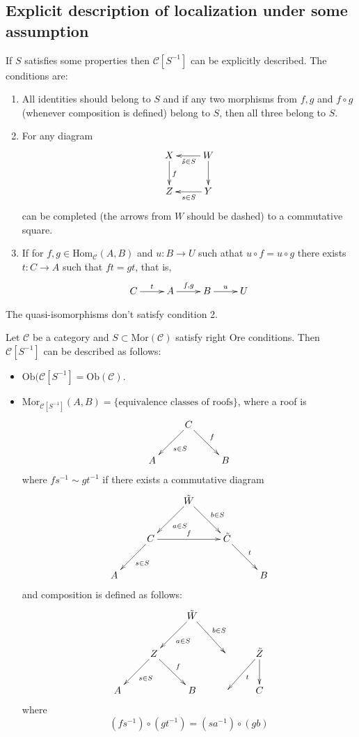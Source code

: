\subsection*{Explicit description of localization under some assumption}
\label{subsection-explicit-description-of-localization}

If $S$ satisfies some properties then $\mathcal{C}[S^{-1}]$ can be explicitly
described. The conditions are:

\begin{enumerate}
\item All identities should belong to $S$ and if any two morphisms from $f,g$
and $f \circ g$ (whenever composition is defined) belong to $S$, then all three
belong to $S$.
\item For any diagram 
$$
\xymatrix{
X\ar[d]^{f}&W\ar[l]^{\tilde{s}\in S}\ar[d]\\
Z&\ar[l]^{s\in S}Y
}
$$
can be completed (the arrows from $W$ should be dashed) to a commutative square.
\item If for $f,g\in \text{Hom}_{\mathcal{C}}(A,B)$ and $u:B \to U$ such athat
$u\circ f=u\circ g$ there exists
$t:C \to A$ such that $ft=gt$, that is,
$$
\xymatrix{
C\ar[r]^{t}&A\ar[r]^{f,g}&B\ar[r]^{u}&U
}
$$
\end{enumerate}

The quasi-isomorphisms don't satisfy condition 2.

\begin{proposition}
\label{proposition-caracterization-of-derived-category}
Let $\mathcal{C}$ be a category and $S\subset \text{Mor}(\mathcal{C})$ satisfy
right Ore conditions. Then $\mathcal{C}[S^{-1}]$ can be described as follows:
\begin{itemize}
\item $\text{Ob}(\mathcal{C}[S^{-1}]=\text{Ob}(\mathcal{C})$.
\item $\text{Mor}_{\mathcal{C}[S^{-1}]}(A,B)=\{\text{equivalence classes of
roofs}\}$, where a roof is
$$
\xymatrix{
& C\ar[dl]^{s\in S}\ar[dr]^{f}\\
A&&B
}
$$
where $fs^{-1}\sim gt^{-1}$ if there exists a commutative diagram
$$
\xymatrix{
& & \tilde{W} \ar[ld]^{a \in S} \ar[dr]^{b \in S} & & \\
& C \ar[ld]^{s \in S} \ar[rr]^{f} & & \tilde{C} \ar[rd]^{t} & \\
A & & & & B
}
$$
and composition is defined as follows:
$$
\xymatrix{
& & \tilde{W}\ar[ld]^{a \in S}\ar[dr]^{b \in S}\\
&Z\ar[ld]^{s \in S}\ar[dr]^{f} & & & \tilde{Z}\ar[d]\ar[dl]^{t}\\
A & &B & & C
}
$$
where
$$
(fs^{-1})\circ (gt^{-1})=(sa^{-1})\circ(gb)
$$
\end{itemize}
\end{proposition}

